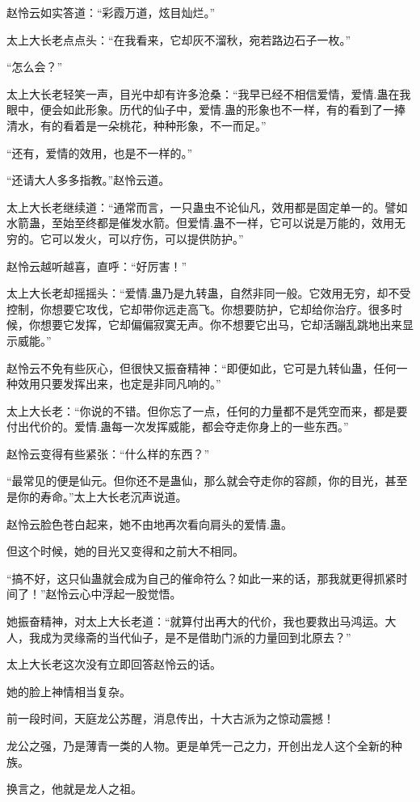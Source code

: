 \begin{this_body}
赵怜云如实答道：“彩霞万道，炫目灿烂。”

太上大长老点点头：“在我看来，它却灰不溜秋，宛若路边石子一枚。”

“怎么会？”

太上大长老轻笑一声，目光中却有许多沧桑：“我早已经不相信爱情，爱情.蛊在我眼中，便会如此形象。历代的仙子中，爱情.蛊的形象也不一样，有的看到了一捧清水，有的看着是一朵桃花，种种形象，不一而足。”

“还有，爱情的效用，也是不一样的。”

“还请大人多多指教。”赵怜云道。

太上大长老继续道：“通常而言，一只蛊虫不论仙凡，效用都是固定单一的。譬如水箭蛊，至始至终都是催发水箭。但爱情.蛊不一样，它可以说是万能的，效用无穷的。它可以发火，可以疗伤，可以提供防护。”

赵怜云越听越喜，直呼：“好厉害！”

太上大长老却摇摇头：“爱情.蛊乃是九转蛊，自然非同一般。它效用无穷，却不受控制，你想要它攻伐，它却带你远走高飞。你想要防护，它却给你治疗。很多时候，你想要它发挥，它却偏偏寂寞无声。你不想要它出马，它却活蹦乱跳地出来显示威能。”

赵怜云不免有些灰心，但很快又振奋精神：“即便如此，它可是九转仙蛊，任何一种效用只要发挥出来，也定是非同凡响的。”

太上大长老：“你说的不错。但你忘了一点，任何的力量都不是凭空而来，都是要付出代价的。爱情.蛊每一次发挥威能，都会夺走你身上的一些东西。”

赵怜云变得有些紧张：“什么样的东西？”

“最常见的便是仙元。但你还不是蛊仙，那么就会夺走你的容颜，你的目光，甚至是你的寿命。”太上大长老沉声说道。

赵怜云脸色苍白起来，她不由地再次看向肩头的爱情.蛊。

但这个时候，她的目光又变得和之前大不相同。

“搞不好，这只仙蛊就会成为自己的催命符么？如此一来的话，那我就更得抓紧时间了！”赵怜云心中浮起一股觉悟。

她振奋精神，对太上大长老道：“就算付出再大的代价，我也要救出马鸿运。大人，我成为灵缘斋的当代仙子，是不是借助门派的力量回到北原去？”

太上大长老这次没有立即回答赵怜云的话。

她的脸上神情相当复杂。

前一段时间，天庭龙公苏醒，消息传出，十大古派为之惊动震撼！

龙公之强，乃是薄青一类的人物。更是单凭一己之力，开创出龙人这个全新的种族。

换言之，他就是龙人之祖。


\end{this_body}

